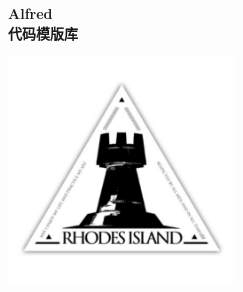 \documentclass[landscape]{article}
\begin{document}
\thispagestyle{empty}
\null\vfill
\begin{center}
  \Huge \textbf{Alfred\\代码模版库}

\vspace{3cm}

\includegraphics[height=6cm]{rhologo.pdf}
\end{center}
\vfill
\clearpage

\begin{multicols}{2}
\tableofcontents
\end{multicols}

\newpage

\columnseprule=0.25pt

\begin{multicols}{2}

\end{multicols}
\end{document}
